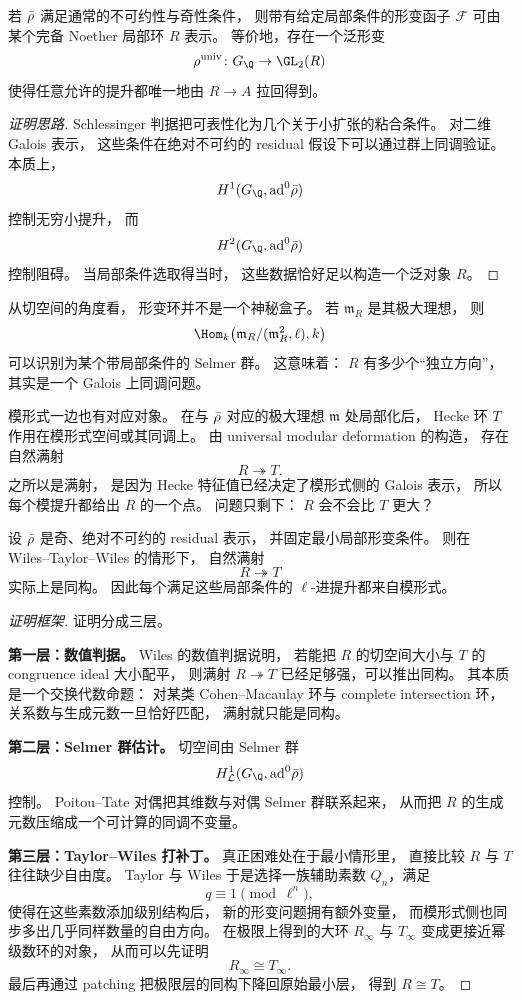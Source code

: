 \begin{theorem}
\label{thm:ch10-mazur}
若 $\bar{\rho}$ 满足通常的不可约性与奇性条件，
则带有给定局部条件的形变函子 $\mathcal F$ 可由某个完备 Noether 局部环 $R$ 表示。
等价地，存在一个泛形变
\[
  \rho^{\mathrm{univ}}\colon G_\Q\to \GL_2(R)
\]
使得任意允许的提升都唯一地由 $R\to A$ 拉回得到。
\end{theorem}

\begin{proof}[证明思路]
Schlessinger 判据把可表性化为几个关于小扩张的粘合条件。
对二维 Galois 表示，
这些条件在绝对不可约的 residual 假设下可以通过群上同调验证。
本质上，
\[
  H^1(G_\Q,\mathrm{ad}^0\rhobar)
\]
控制无穷小提升，
而
\[
  H^2(G_\Q,\mathrm{ad}^0\rhobar)
\]
控制阻碍。
当局部条件选取得当时，
这些数据恰好足以构造一个泛对象 $R$。
\end{proof}

从切空间的角度看，
形变环并不是一个神秘盒子。
若 $\mathfrak m_R$ 是其极大理想，
则
\[
  \Hom_k\bigl(\mathfrak m_R/(\mathfrak m_R^2,\ell),k\bigr)
\]
可以识别为某个带局部条件的 Selmer 群。
这意味着：
$R$ 有多少个“独立方向”，
其实是一个 Galois 上同调问题。

模形式一边也有对应对象。
在与 $\bar{\rho}$ 对应的极大理想 $\mathfrak m$ 处局部化后，
Hecke 环 $T$ 作用在模形式空间或其同调上。
由 universal modular deformation 的构造，
存在自然满射
\[
  R\twoheadrightarrow T.
\]
之所以是满射，
是因为 Hecke 特征值已经决定了模形式侧的 Galois 表示，
所以每个模提升都给出 $R$ 的一个点。
问题只剩下：
$R$ 会不会比 $T$ 更大？

\begin{theorem}[Wiles 的 $R=T$ 定理，简化表述]
\label{thm:ch10-rt}
设 $\bar{\rho}$ 是奇、绝对不可约的 residual 表示，
并固定最小局部形变条件。
则在 Wiles--Taylor--Wiles 的情形下，
自然满射
\[
  R\twoheadrightarrow T
\]
实际上是同构。
因此每个满足这些局部条件的 $\ell$-进提升都来自模形式。
\end{theorem}

\begin{proof}[证明框架]
证明分成三层。

\textbf{第一层：数值判据。}
Wiles 的数值判据说明，
若能把 $R$ 的切空间大小与 $T$ 的 congruence ideal 大小配平，
则满射 $R\twoheadrightarrow T$ 已经足够强，可以推出同构。
其本质是一个交换代数命题：
对某类 Cohen--Macaulay 环与 complete intersection 环，
关系数与生成元数一旦恰好匹配，
满射就只能是同构。

\textbf{第二层：Selmer 群估计。}
切空间由 Selmer 群
\[
  H^1_{\mathcal L}(G_\Q,\mathrm{ad}^0\rhobar)
\]
控制。
Poitou--Tate 对偶把其维数与对偶 Selmer 群联系起来，
从而把 $R$ 的生成元数压缩成一个可计算的同调不变量。

\textbf{第三层：Taylor--Wiles 打补丁。}
真正困难处在于最小情形里，
直接比较 $R$ 与 $T$ 往往缺少自由度。
Taylor 与 Wiles 于是选择一族辅助素数 $Q_n$，满足
\[
  q\equiv 1\pmod{\ell^n},
\]
使得在这些素数添加级别结构后，
新的形变问题拥有额外变量，
而模形式侧也同步多出几乎同样数量的自由方向。
在极限上得到的大环 $R_\infty$ 与 $T_\infty$ 变成更接近幂级数环的对象，
从而可以先证明
\[
  R_\infty\cong T_\infty.
\]
最后再通过 patching 把极限层的同构下降回原始最小层，
得到 $R\cong T$。
\end{proof}

